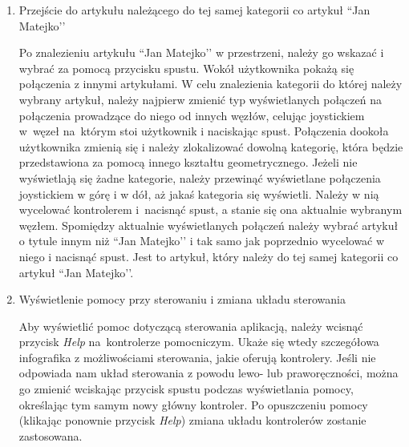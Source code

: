 \begin{enumerate}
\item Przejście do artykułu należącego do tej samej kategorii co artykuł ``Jan Matejko’’

    Po znalezieniu artykułu ``Jan Matejko’’ w przestrzeni, należy go wskazać i wybrać za pomocą przycisku spustu. Wokół użytkownika pokażą się połączenia z innymi artykułami. W celu znalezienia kategorii do której należy wybrany artykuł, należy najpierw zmienić typ wyświetlanych połączeń na połączenia prowadzące do niego od innych węzłów, celując joystickiem w~węzeł na~którym stoi użytkownik i naciskając spust. Połączenia dookoła użytkownika zmienią się i należy zlokalizować dowolną kategorię, która będzie przedstawiona za pomocą innego kształtu geometrycznego. Jeżeli nie wyświetlają się żadne kategorie, należy przewinąć wyświetlane połączenia joystickiem w górę i w dół, aż jakaś kategoria się wyświetli. Należy w nią wycelować kontrolerem i~nacisnąć spust, a stanie się ona aktualnie wybranym węzłem. Spomiędzy aktualnie wyświetlanych połączeń należy wybrać artykuł o tytule innym niż ``Jan Matejko’’ i tak samo jak poprzednio wycelować w niego i nacisnąć spust. Jest to artykuł, który należy do tej samej kategorii co artykuł ``Jan Matejko’’.
	\newpage
\item Wyświetlenie pomocy przy sterowaniu i zmiana układu sterowania

	Aby wyświetlić pomoc dotyczącą sterowania aplikacją, należy wcisnąć przycisk \textit{Help} na~kontrolerze pomocniczym. Ukaże się wtedy szczegółowa infografika z możliwościami sterowania, jakie oferują kontrolery. Jeśli nie odpowiada nam układ sterowania z powodu lewo- lub praworęczności, można go zmienić wciskając przycisk spustu podczas wyświetlania pomocy, określając tym samym nowy główny kontroler. Po opuszczeniu pomocy (klikając ponownie przycisk \textit{Help}) zmiana układu kontrolerów zostanie zastosowana.
\end{enumerate}
